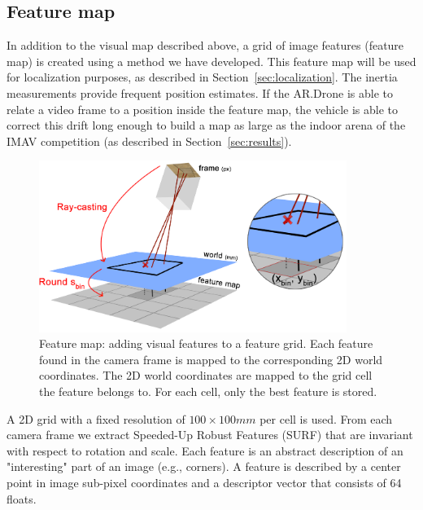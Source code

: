 		\subsection{Feature map}
\label{sec:feature_map}
In addition to the visual map described above, a grid of image features (feature map) is created using a method we have developed.
This feature map will be used for localization purposes, as described in Section~\ref{sec:localization}.
The inertia measurements provide frequent position estimates.
If the AR.Drone is able to relate a video frame to a position inside the feature map, the vehicle is able to correct this drift long enough to build a map 
as large as the indoor arena of the IMAV competition (as described in Section~\ref{sec:results}).

\begin{figure}[htb]
\centering
\includegraphics[width=10cm]{images/mapping3.png}
\caption{Feature map: adding visual features to a feature grid. Each feature found in the camera frame is mapped to the corresponding 2D world coordinates. The 2D world coordinates are mapped to the grid cell the feature belongs to. For each cell, only the best feature is stored.}
\label{fig:mapping3}
\end{figure}

A 2D grid with a fixed resolution of $100 \times 100mm$ per cell is used.
From each camera frame we extract Speeded-Up Robust Features (SURF) \cite{Bay2008cviu} that are invariant with respect to rotation and scale.
Each feature is an abstract description of an "interesting" part of an image (e.g., corners).
A feature is described by a center point in image sub-pixel coordinates and a descriptor vector that consists of 64 floats.

